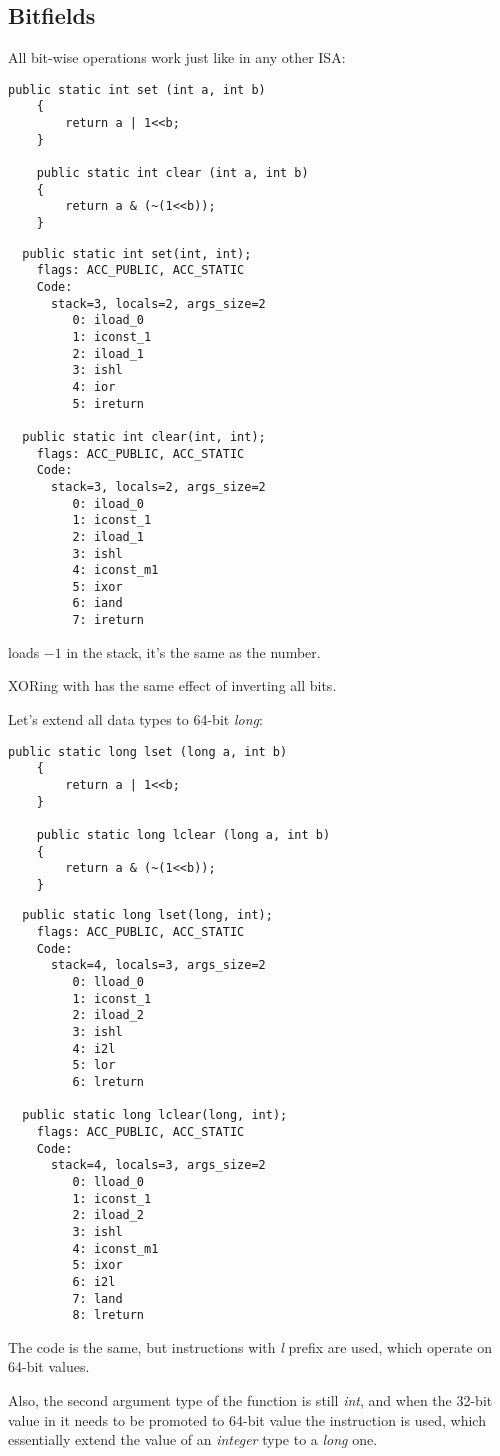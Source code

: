 \subsection{Bitfields}

All bit-wise operations work just like in any other \ac{ISA}:


\begin{lstlisting}[style=customjava]
	public static int set (int a, int b)
	{
		return a | 1<<b;
	}

	public static int clear (int a, int b)
	{
		return a & (~(1<<b));
	}
\end{lstlisting}

\begin{lstlisting}
  public static int set(int, int);
    flags: ACC_PUBLIC, ACC_STATIC
    Code:
      stack=3, locals=2, args_size=2
         0: iload_0
         1: iconst_1
         2: iload_1
         3: ishl
         4: ior
         5: ireturn

  public static int clear(int, int);
    flags: ACC_PUBLIC, ACC_STATIC
    Code:
      stack=3, locals=2, args_size=2
         0: iload_0
         1: iconst_1
         2: iload_1
         3: ishl
         4: iconst_m1
         5: ixor
         6: iand
         7: ireturn
\end{lstlisting}

 loads $-1$ in the stack, it's the same as the  number.

XORing with  has the same effect of inverting all bits.

Let's extend all data types to 64-bit \emph{long}:


\begin{lstlisting}[style=customjava]
	public static long lset (long a, int b)
	{
		return a | 1<<b;
	}

	public static long lclear (long a, int b)
	{
		return a & (~(1<<b));
	}
\end{lstlisting}

\begin{lstlisting}
  public static long lset(long, int);
    flags: ACC_PUBLIC, ACC_STATIC
    Code:
      stack=4, locals=3, args_size=2
         0: lload_0
         1: iconst_1
         2: iload_2
         3: ishl
         4: i2l
         5: lor
         6: lreturn

  public static long lclear(long, int);
    flags: ACC_PUBLIC, ACC_STATIC
    Code:
      stack=4, locals=3, args_size=2
         0: lload_0
         1: iconst_1
         2: iload_2
         3: ishl
         4: iconst_m1
         5: ixor
         6: i2l
         7: land
         8: lreturn
\end{lstlisting}

The code is the same, but instructions with \emph{l} prefix are used, which operate
on 64-bit values.

Also, the second argument type of the function is still \emph{int}, and when the 32-bit value in it
needs to be promoted to 64-bit value the  instruction is used,
which essentially extend the value of an \emph{integer} type to a \emph{long} one.

